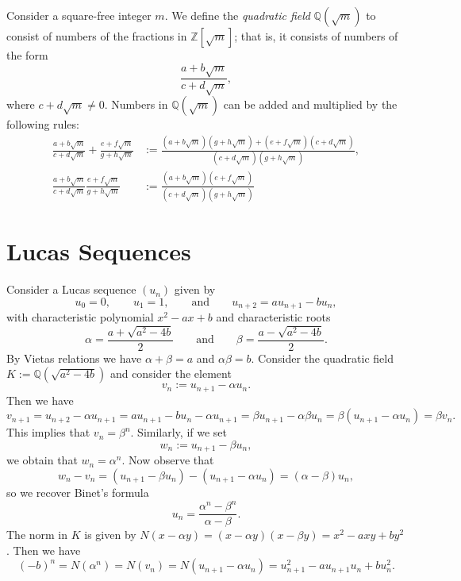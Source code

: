 \begin{definition}
  Consider a square-free integer $m$. We define the \emph{quadratic field} $\mathbb{Q}(\sqrt{m})$ to consist of numbers of the fractions in $\mathbb{Z}[\sqrt{m}]$; that is, it consists of numbers of the form
  \begin{equation*}
    \frac{a+b\sqrt{m}}{c+d\sqrt{m}},
  \end{equation*}
  where $c+d\sqrt{m}\neq 0$. Numbers in $\mathbb{Q}(\sqrt{m})$ can be added and multiplied by the following rules:
  \begin{align*}
    \frac{a+b\sqrt{m}}{c+d\sqrt{m}}+\frac{e+f\sqrt{m}}{g+h\sqrt{m}} & := \frac{(a+b\sqrt{m})(g+h\sqrt{m})+(e+f\sqrt{m})(c+d\sqrt{m})}{(c+d\sqrt{m})(g+h\sqrt{m})}, \\
    \frac{a+b\sqrt{m}}{c+d\sqrt{m}} \frac{e+f\sqrt{m}}{g+h\sqrt{m}} & := \frac{(a+b\sqrt{m})(e+f\sqrt{m})}{(c+d\sqrt{m})(g+h\sqrt{m})}
  \end{align*}
\end{definition}

\section{Lucas Sequences}

Consider a Lucas sequence $(u_n)$ given by
\begin{equation*}
  u_0=0,\qquad u_1=1,\qquad\text{and}\qquad u_{n+2}=au_{n+1}-bu_n,
\end{equation*}
with characteristic polynomial $x^2-ax+b$ and characteristic roots
\begin{equation*}
  \alpha = \frac{a+\sqrt{a^2-4b}}{2}\qquad\text{and}\qquad \beta=\frac{a-\sqrt{a^2-4b}}{2}.
\end{equation*}
By Vietas relations we have $\alpha+\beta=a$ and $\alpha\beta=b$. Consider the quadratic field $K:=\mathbb{Q}(\sqrt{a^2-4b})$ and consider the element
\begin{equation*}
  v_n := u_{n+1}-\alpha u_n.
\end{equation*}
Then we have
\begin{equation*}
  v_{n+1}=u_{n+2}-\alpha u_{n+1}=au_{n+1}-b u_n-\alpha u_{n+1}=\beta u_{n+1}- \alpha\beta u_n=\beta(u_{n+1}-\alpha u_n)=\beta v_n.
\end{equation*}
This implies that $v_n=\beta^n$. Similarly, if we set
\begin{equation*}
  w_n := u_{n+1}-\beta u_n,
\end{equation*}
we obtain that $w_n=\alpha^n$. Now observe that
\begin{equation*}
  w_n-v_n=(u_{n+1}-\beta u_n)-(u_{n+1}-\alpha u_n)= (\alpha-\beta)u_n,
\end{equation*}
so we recover Binet's formula
\begin{equation*}
  u_n=\frac{\alpha^n-\beta^n}{\alpha-\beta}.
\end{equation*}
The norm in $K$ is given by $N(x-\alpha y)= (x-\alpha y)(x-\beta y)= x^2- axy + by^2$. Then we have
\begin{equation*}
  (-b)^n = N(\alpha^n)=N(v_n)=N(u_{n+1}-\alpha u_n)=u_{n+1}^2-a u_{n+1}u_n + b u_n^2.
\end{equation*}

